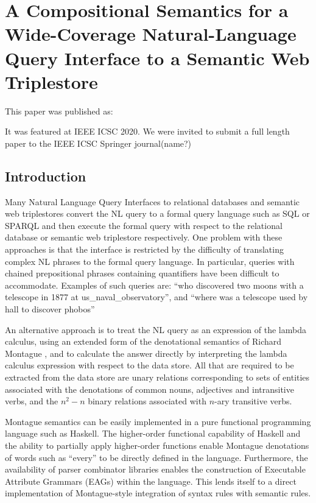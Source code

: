 \documentclass[../main.tex]{subfiles}
\begin{document}
\chapter{A Compositional Semantics for a Wide-Coverage Natural-Language Query Interface to a Semantic Web Triplestore}
\begin{refsection}

This paper was published as:


It was featured at IEEE ICSC 2020.  We were invited to submit a full length paper to the IEEE ICSC Springer journal(name?) %

\label{chapter:icsc2020conf}


\section{Introduction}

Many Natural Language Query Interfaces to relational databases and semantic web triplestores
convert the NL query to a formal query language such as SQL or SPARQL and then execute the formal
query with respect to the relational database or semantic web triplestore respectively. One problem with
these approaches is that the interface is restricted by the difficulty of translating complex NL phrases to
the formal query language. In particular, queries with chained prepositional phrases containing
quantifiers have been difficult to accommodate. Examples of such queries are: ``who discovered two
moons with a telescope in 1877 at us\_naval\_observatory'', and ``where was a telescope used by hall to discover phobos''

An alternative approach is to treat the NL query as an expression of the lambda calculus, using an
extended form of the denotational semantics of Richard Montague \cite{Dowty:wall}, and to calculate the answer directly
by interpreting the lambda calculus expression with respect to the data store. All that are required to be
extracted from the data store are unary relations corresponding to sets of entities associated with the
denotations of common nouns, adjectives and intransitive verbs, and the $n^2 - n$ binary relations
associated with $n$-ary transitive verbs.

Montague semantics can be easily implemented in a pure functional programming language such as
Haskell. The higher-order functional capability of Haskell and the ability to partially apply higher-order functions enable Montague denotations of words such as ``every'' to be directly defined in the language. Furthermore, the availability of
parser combinator libraries enables the construction of Executable Attribute Grammars (EAGs) within the language.
This lends itself to a direct implementation of Montague-style integration of syntax rules with semantic rules.


\end{refsection}
\end{document}
